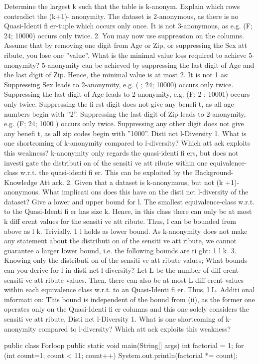 


Determine the largest k such that the table is k-anonym. Explain which rows contradict the (k+1)-
anonymity. The dataset is 2-anonymous, as there is no Quasi-Identi fi er-tuple which occurs only once.
It is not 3-anonymous, as e.g. (F; 24; 10000) occurs only twice.
2. You may now use suppression on the columns. Assume that by removing one digit from Age or Zip,
or suppressing the Sex att ribute, you lose one ”value”. What is the minimal value loss required to
achieve 5-anonymity?
5-anonymity can be achieved by suppressing the last digit of Age and the last digit of Zip. Hence,
the minimal value is at most 2. It is not 1 as:
Suppressing Sex leads to 2-anonymity, e.g. ( ; 24; 10000) occurs only twice.
Suppressing the last digit of Age leads to 2-anonymity, e.g. (F; 2 ; 10001) occurs only twice.
Suppressing the fi rst digit does not give any benefi t, as all age numbers begin with ”2”.
Suppressing the last digit of Zip leads to 2-anonymity, e.g. (F; 24; 1000 ) occurs only twice.
Suppressing any other digit does not give any benefi t, as all zip codes begin with ”1000”.
Disti nct l-Diversity
1. What is one shortcoming of k-anonymity compared to l-diversity? Which att ack exploits this weakness?
k-anonymity only regards the quasi-identi fi ers, but does not investi gate the distributi on of the sensiti ve
att ribute within one equivalence-class w.r.t. the quasi-identi fi er. This can be exploited by the
Background-Knowledge Att ack.
2. Given that a dataset is k-anonymous, but not (k +1)-anonymous. What implicati ons does this have
on the disti nct l-diversity of the dataset? Give a lower and upper bound for l.
The smallest equivalence-class w.r.t. to the Quasi-Identi fi er has size k. Hence, in this class there
can only be at most k diff erent values for the sensiti ve att ribute. Thus, l can be bounded from above
as l k. Trivially, 1 l holds as lower bound. As k-anonymity does not make any statement
about the distributi on of the sensiti ve att ribute, we cannot guarantee a larger lower bound, i.e. the
following bounds are ti ght: 1 l k.
3. Knowing only the distributi on of the sensiti ve att ribute values; What bounds can you derive for l in
disti nct l-diversity?
Let L be the number of diff erent sensiti ve att ribute values. Then, there can also be at most L diff erent
values within each equivalence class w.r.t. to an Quasi-Identi fi er. Thus, l L.
Additi onal informati on: This bound is independent of the bound from (ii), as the former one operates
only on the Quasi-Identi fi er columns and this one solely considers the sensiti ve att ribute.
Disti nct l-Diversity
1. What is one shortcoming of k-anonymity compared to l-diversity? Which att ack exploits this weakness?
\begin{codeblock}
public class Forloop {
  public static void main(String[] args) {
    int factorial = 1;
    for (int count=1; count < 11; count++) {
       System.out.println(factorial *= count);
    }
  }
}
\end{codeblock}

